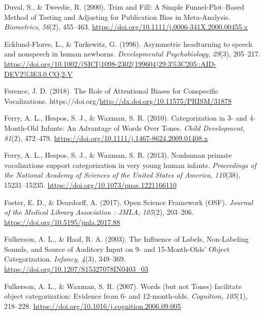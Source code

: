 \documentclass[
  english,
  man]{apa6}
\newlength{\cslhangindent}
\newlength{\cslentryspacingunit} %
\newenvironment{CSLReferences}[2] %
 {%
  \setlength{\parindent}{0pt}
  \ifodd #1
  \let\oldpar\par
  \def\par{\hangindent=\cslhangindent\oldpar}
  \fi
  \setlength{\parskip}{#2\cslentryspacingunit}
 }%
 {}
\begin{document}
\begin{CSLReferences}{1}{0}
\leavevmode{}%
Duval, S., \& Tweedie, R. (2000). Trim and {Fill}: {A} {Simple} {Funnel}-{Plot}--{Based} {Method} of {Testing} and {Adjusting} for {Publication} {Bias} in {Meta}-{Analysis}. \emph{Biometrics}, \emph{56}(2), 455--463. \url{https://doi.org/10.1111/j.0006-341X.2000.00455.x}

\leavevmode{}%
Ecklund-Flores, L., \& Turkewitz, G. (1996). Asymmetric headturning to speech and nonspeech in human newborns. \emph{Developmental Psychobiology}, \emph{29}(3), 205--217. \url{https://doi.org/10.1002/(SICI)1098-2302(199604)29:3\%3C205::AID-DEV2\%3E3.0.CO;2-V}

\leavevmode{}%
Ference, J. D. (2018). The {Role} of {Attentional} {Biases} for {Conspecific} {Vocalizations}. https://doi.org/\url{http://dx.doi.org/10.11575/PRISM/31878}

\leavevmode{}%
Ferry, A. L., Hespos, S. J., \& Waxman, S. R. (2010). Categorization in 3- and 4-{Month}-{Old} {Infants}: {An} {Advantage} of {Words} {Over} {Tones}. \emph{Child Development}, \emph{81}(2), 472--479. \url{https://doi.org/10.1111/j.1467-8624.2009.01408.x}

\leavevmode{}%
Ferry, A. L., Hespos, S. J., \& Waxman, S. R. (2013). Nonhuman primate vocalizations support categorization in very young human infants. \emph{Proceedings of the National Academy of Sciences of the United States of America}, \emph{110}(38), 15231--15235. \url{https://doi.org/10.1073/pnas.1221166110}

\leavevmode{}%
Foster, E. D., \& Deardorff, A. (2017). Open {Science} {Framework} ({OSF}). \emph{Journal of the Medical Library Association : JMLA}, \emph{105}(2), 203--206. \url{https://doi.org/10.5195/jmla.2017.88}

\leavevmode{}%
Fulkerson, A. L., \& Haaf, R. A. (2003). The {Influence} of {Labels}, {Non}-{Labeling} {Sounds}, and {Source} of {Auditory} {Input} on 9- and 15-{Month}-{Olds}' {Object} {Categorization}. \emph{Infancy}, \emph{4}(3), 349--369. \url{https://doi.org/10.1207/S15327078IN0403_03}

\leavevmode{}%
Fulkerson, A. L., \& Waxman, S. R. (2007). Words (but not {Tones}) facilitate object categorization: {Evidence} from 6- and 12-month-olds. \emph{Cognition}, \emph{105}(1), 218--228. \url{https://doi.org/10.1016/j.cognition.2006.09.005}


\end{CSLReferences}
\end{document}
